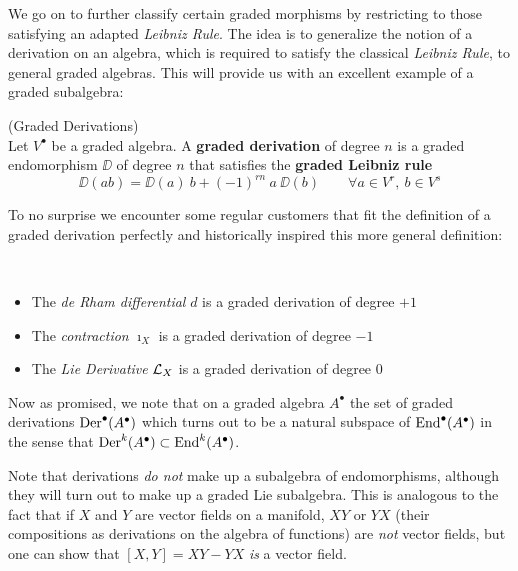 We go on to further classify certain graded morphisms by restricting to those satisfying an adapted \emph{Leibniz Rule}. The idea is to generalize the notion of a derivation on an algebra, which is required to satisfy the classical \emph{Leibniz Rule}, to general graded algebras. This will provide us with an excellent example of a graded subalgebra:

\begin{definition} (Graded Derivations)\\
  Let $V^\bullet$ be a graded algebra. A \textbf{graded derivation} of degree $n$ is a graded endomorphism $\DD$ of degree $n$ that satisfies the \textbf{graded Leibniz rule}
  $$ \DD (ab) = \DD(a) \ b + (-1)^{rn} \ a \ \DD(b) \quad \quad \forall a \in V^r, \ b \in V^s $$
\end{definition}

To no surprise we encounter some regular customers that fit the definition of a graded derivation perfectly and historically inspired this more general definition:

\begin{example}~
  \begin{itemize}
    \item The \emph{de Rham differential} $d$ is a graded derivation of degree $+1$
    \item The \emph{contraction} $\imath_X$ is a graded derivation of degree $-1$
    \item The \emph{Lie Derivative} $\mathcal{L}_{X}$ is a graded derivation of degree $0$
  \end{itemize}
\end{example}

Now as promised, we note that on a graded algebra $A^\bullet$ the set of graded derivations $\operatorname{Der}^\bullet(A^\bullet)$ which turns out to be a natural subspace of $\operatorname{End}^\bullet(A^\bullet)$ in the sense that $\operatorname{Der}^k(A^\bullet) \subset \operatorname{End}^k(A^\bullet)$.%

\begin{rem}
  Note that derivations \emph{do not} make up a subalgebra of endomorphisms, although they will turn out to make up a graded Lie subalgebra. This is analogous to the fact that if $X$ and $Y$ are vector fields on a manifold, $XY$ or $YX$ (their compositions as derivations on the algebra of functions) are \emph{not} vector fields, but one can show that $[X,Y]=XY-YX$ \emph{is} a vector field.
\end{rem}

